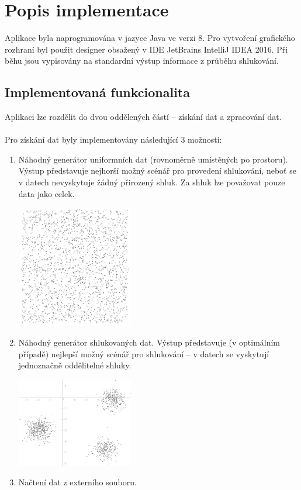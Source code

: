 \documentclass[pdftex,a4paper]{article}
\begin{document}
\newpage

\section{Popis implementace}
Aplikace byla naprogramována v jazyce Java ve verzi 8. Pro vytvoření grafického rozhraní byl použit designer obsažený v IDE JetBrains IntelliJ IDEA 2016. Při běhu jsou vypisovány na standardní výstup informace z průběhu shlukování.



\subsection{Implementovaná funkcionalita}
\noindent
Aplikaci lze rozdělit do dvou oddělených částí -- získání dat a zpracování dat.\\\\
\noindent
Pro získání dat byly implementovány následující 3 možnosti:
\begin{enumerate}
	
	\item Náhodný generátor uniformních dat (rovnoměrně umístěných po prostoru). Výstup představuje nejhorší možný scénář pro provedení shlukování, neboť se v datech nevyskytuje žádný přirozený shluk. Za shluk lze považovat pouze data jako celek.
	\begin{center}
		\includegraphics[width=0.4\textwidth]{res/datauniform.png}
	\end{center}

	\newpage

	\item Náhodný generátor shlukovaných dat. Výstup představuje (v optimálním případě) nejlepší možný scénář pro shlukování -- v datech se vyskytují jednoznačně oddělitelné shluky.
	\begin{center}
		\includegraphics[width=0.4\textwidth]{res/dataclustered.png}
	\end{center}

	\item Načtení dat z externího souboru.
\end{enumerate}
\end{document}
